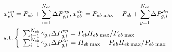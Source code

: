 \begin{align} &x_{eb}^{up} = {P_{eb}} + \sum\limits_{i = 1}^{{N_{eb}}} {\Delta P_{g,i}^{up}},x_{eb}^{dn} = {P_{eb\;{\rm{max}}}} - {P_{eb}} + \sum\limits_{g = 1}^{{N_{eb}}} {\Delta P_{g,i}^{dn}} \\ & {\text{s.t.}}\left\{ \begin{array}{l} \sum\nolimits_{i = 1}^{{N_{eb}}} {{\gamma _{g,i}}\Delta P_{g,i}^{up}} = {P_{eb}}{H_{eb\;{\rm{max}}}}/{P_{eb\;{\rm{max}}}}\\ \sum\nolimits_{i = 1}^{{N_{eb}}} {{\gamma _{g,i}}\Delta P_{g,i}^{dn}} = {H_{eb\;{\rm{max}}}} - {P_{eb}}{H_{eb\;{\rm{max}}}}/{P_{eb\;{\rm{max}}}} \end{array} \right. \end{align}
